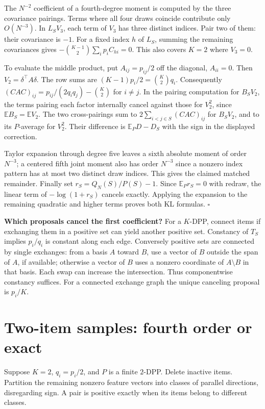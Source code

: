 \documentclass[11pt]{article}
\newcommand{\E}{\mathbb E}\newcommand{\Var}{\operatorname{Var}}\newcommand{\KL}{\operatorname{KL}}
\begin{document}
The $N^{-2}$ coefficient of a fourth-degree moment is computed by the three covariance pairings. Terms where all four draws coincide contribute only $O(N^{-3})$. In $L_S V_3$, each term of $V_3$ has three distinct indices. Pair two of them: their covariance is $-1$. For a fixed index $h$ of $L_S$, summing the remaining covariances gives $-\binom{K-1}{2}\sum_i p_i C_{hi}=0$. This also covers $K=2$ where $V_3=0$.

To evaluate the middle product, put $A_{ij}=p_{ij}/2$ off the diagonal, $A_{ii}=0$. Then $V_2=\delta^\top A\delta$. The row sums are $(K-1)p_i/2=\binom K2 q_i$. Consequently $(CAC)_{ij}=p_{ij}/(2q_iq_j)-\binom K2$ for $i\ne j$. In the pairing computation for $B_S V_2$, the terms pairing each factor internally cancel against those for $V_2^2$, since $\E B_S=\E V_2$. The two cross-pairings sum to $2\sum_{i<j\in S}(CAC)_{ij}$ for $B_S V_2$, and to its $P$-average for $V_2^2$. Their difference is $\E_P D-D_S$ with the sign in the displayed correction.

Taylor expansion through degree five leaves a sixth absolute moment of order $N^{-3}$; a centered fifth joint moment also has order $N^{-3}$ since a nonzero index pattern has at most two distinct draw indices. This gives the claimed matched remainder. Finally set $r_S=Q_N(S)/P(S)-1$. Since $\E_P r_S=0$ with redraw, the linear term of $-\log(1+r_S)$ cancels exactly. Applying the expansion to the remaining quadratic and higher terms proves both KL formulas. \hfill$\square$

\textbf{Which proposals cancel the first coefficient?} For a $K$-DPP, connect items if exchanging them in a positive set can yield another positive set. Constancy of $T_S$ implies $p_i/q_i$ is constant along each edge. Conversely positive sets are connected by single exchanges: from a basis $A$ toward $B$, use a vector of $B$ outside the span of $A$, if available; otherwise a vector of $B$ uses a nonzero coordinate of $A\setminus B$ in that basis. Each swap can increase the intersection. Thus componentwise constancy suffices. For a connected exchange graph the unique canceling proposal is $p_i/K$.

\newpage
\section{Two-item samples: fourth order or exact}
Suppose $K=2$, $q_i=p_i/2$, and $P$ is a finite $2$-DPP. Delete inactive items. Partition the remaining nonzero feature vectors into classes of parallel directions, disregarding sign. A pair is positive exactly when its items belong to different classes.
\end{document}

